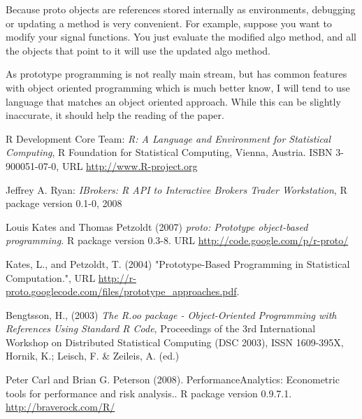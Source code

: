 \documentclass[nofootinbib]{revtex4}
\begin{document}
Because proto objects are references stored internally as
environments, debugging or updating a method is very convenient.  For
example, suppose you want to modify your signal functions.  You just
evaluate the modified algo method, and all the objects that point to
it will use the updated algo method.

As prototype programming is not really main stream, but has common
features with object oriented programming which is much better know, I
will tend to use language that matches an object oriented approach.
While this can be slightly inaccurate, it should help the reading of
the paper.



\begin{thebibliography}{99}

 R Development Core Team:
\emph{R: A Language and Environment for Statistical Computing},
R Foundation for Statistical Computing, Vienna, Austria.
ISBN 3-900051-07-0, URL \url{http://www.R-project.org}

Jeffrey A. Ryan: \emph{IBrokers: R API to
  Interactive Brokers Trader Workstation}, R package version 0.1-0,
  2008

Louis Kates and Thomas Petzoldt (2007) \emph{proto:
  Prototype object-based programming.} R package version
  0.3-8. URL \url{http://code.google.com/p/r-proto/}
  
 Kates, L., and Petzoldt, T. (2004)
  "Prototype-Based Programming in Statistical Computation.", URL
  \url{http://r-proto.googlecode.com/files/prototype_approaches.pdf}.

 Bengtsson, H., (2003) \emph{The R.oo package - Object-Oriented
  Programming with References Using Standard R Code}, Proceedings of
  the 3rd International Workshop on Distributed Statistical Computing
  (DSC 2003), ISSN 1609-395X, Hornik, K.; Leisch, F. \& Zeileis,
  A. (ed.)

 Peter Carl and Brian G. Peterson
  (2008). PerformanceAnalytics: Econometric tools for performance and
  risk analysis.. R package version 0.9.7.1.
  \url{http://braverock.com/R/}
  
\end{thebibliography}
\end{document}
